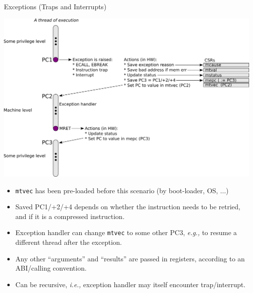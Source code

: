 \documentclass{article}
\newcommand{\ie}{\emph{i.e.,}}
\newcommand{\eg}{\emph{e.g.,}}
\begin{document}
\begin{center}
  {\Huge
    Exceptions (Traps and Interrupts)}

  \vspace*{0.2in}

  \begin{minipage}{9.5in}\Large
    \begin{center}
      \includegraphics[width=7in]{Figs/Exception_Handling.png}
    \end{center}

    \begin{itemize}
    \item {\tt mtvec} has been pre-loaded before this scenario (by boot-loader, OS, ...)

    \item Saved PC1/+2/+4 depends on whether the instruction needs to
      be retried, and if it is a compressed instruction.

    \item Exception handler can change {\tt mtvec} to some other PC3,
      {\eg} to resume a different thread after the exception.

    \item Any other ``arguments'' and ``results'' are passed in
      registers, according to an ABI/calling convention.

    \item Can be recursive, {\ie} exception handler may itself encounter trap/interrupt.
    \end{itemize}
  \end{minipage}

\end{center}

\clearpage
\end{document}
